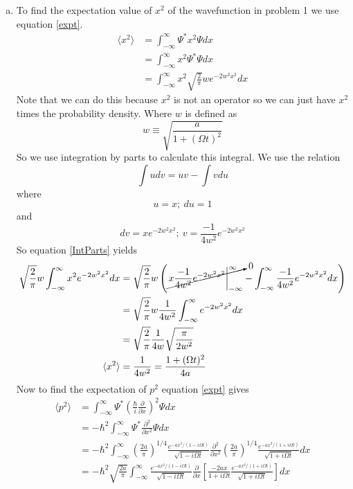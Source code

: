 \documentclass[11pt]{article}
\numberwithin{equation}{section}
\newcommand{\expt}[1]{\langle{#1}\rangle}
\begin{document}
\begin{enumerate}[(a)]
\item
To find the expectation value of $x^2$ of the wavefunction in problem 1 we use equation \ref{expt}. 
\begin{align*}
\expt{x^2} &= \int_{-\infty}^{\infty}\Psi^*x^2\Psi dx\\
&= \int_{-\infty}^{\infty}x^2\Psi^*\Psi dx\\
&= \int_{-\infty}^{\infty}x^2 \sqrt{\frac{2}{\pi}}we^{-2w^2x^2}dx
\end{align*}
Note that we can do this because $x^2$ is not an operator so we can just have $x^2$ times the probability density. Where $w$ is defined as
$$w\equiv\sqrt{\frac{a}{1+(\Omega t)^2}}$$
So we use integration by parts to calculate this integral. We use the relation
\begin{equation}
\int udv = uv - \int vdu
\label{IntParts}
\end{equation}
where 
$$u=x;\ du=1$$
and
$$dv = xe^{-2w^2x^2};\ v=\frac{-1}{4w^2}e^{-2w^2x^2}$$
So equation \ref{IntParts} yields 
\begin{align*}
 \sqrt{\frac{2}{\pi}}w\int_{-\infty}^{\infty}x^2 e^{-2w^2x^2}dx &= \sqrt{\frac{2}{\pi}}w\left(\cancelto{0}{\left.x\frac{-1}{4w^2}e^{-2w^2x^2}\right|_{-\infty}^{\infty}}- \int_{-\infty}^{\infty}\frac{-1}{4w^2}e^{-2w^2x^2}dx\right)\\
&= \sqrt{\frac{2}{\pi}}w\frac{1}{4w^2}\int_{-\infty}^{\infty}e^{-2w^2x^2}dx\\
&= \sqrt{\frac{2}{\pi}}\frac{1}{4w}\sqrt{\frac{\pi}{2w^2}}\\
\expt{x^2} &=\frac{1}{4w^2} = \frac{1+(\Omega t)^2}{4a}
\end{align*}
Now to find the expectation of $p^2$ equation \ref{expt} gives 
\begin{align*}
\expt{p^2} &= \int_{-\infty}^{\infty}\Psi^*\left(\frac{\hbar}{i}\frac{\partial}{\partial x}\right)^2\Psi dx\\
&= -\hbar^2\int_{-\infty}^{\infty}\Psi^*\frac{\partial^2}{\partial x^2}\Psi dx\\
&= -\hbar^2\int_{-\infty}^{\infty}\left(\frac{2a}{\pi}\right)^{1/4}\frac{e^{-ax^2/(1-i\Omega t)}}{\sqrt{1 - i\Omega t}}\frac{\partial^2}{\partial x^2}\left(\frac{2a}{\pi}\right)^{1/4}\frac{e^{-ax^2/(1+i\Omega t)}}{\sqrt{1 + i\Omega t}} dx\\
&= -\hbar^2\sqrt{\frac{2a}{\pi}}\int_{-\infty}^{\infty}\frac{e^{-ax^2/(1-i\Omega t)}}{\sqrt{1 - i\Omega t}}\frac{\partial}{\partial x}\left[\frac{-2ax}{1+i\Omega t}\frac{e^{-ax^2/(1+i\Omega t)}}{\sqrt{1 + i\Omega t}}\right] dx\\

\end{align*}
\end{enumerate}
\end{document}
